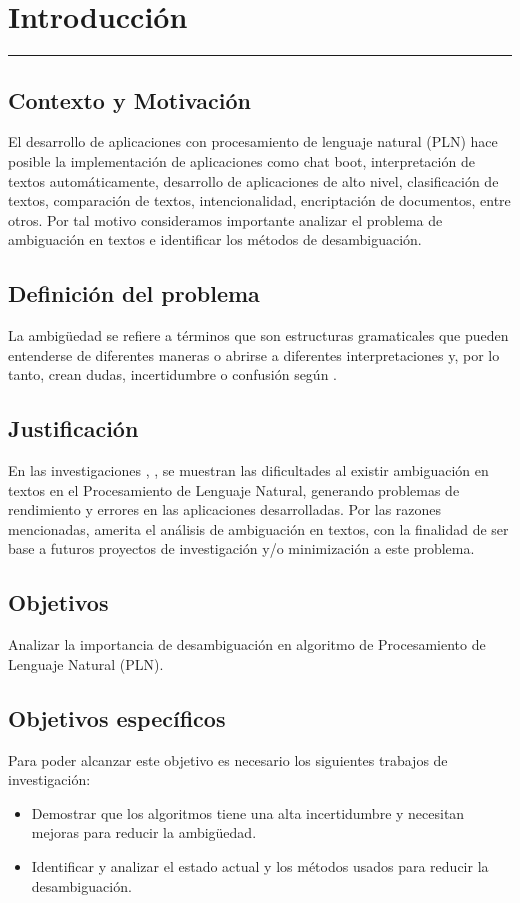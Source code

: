 \chapter{Introducción}
\hrule \bigskip \vspace*{1cm}
\section{Contexto y Motivación}
El desarrollo de aplicaciones con procesamiento de lenguaje natural (PLN) hace posible la implementación de aplicaciones como chat boot, interpretación de textos automáticamente, desarrollo de aplicaciones de alto nivel, clasificación de textos, comparación de textos, intencionalidad, encriptación de documentos, entre otros. Por tal motivo consideramos importante analizar el problema de ambiguación en textos e identificar los métodos de desambiguación. 

\section{Definición del problema}
La ambigüedad se refiere a términos que son estructuras gramaticales que pueden entenderse de diferentes maneras o abrirse a diferentes interpretaciones y, por lo tanto, crean dudas, incertidumbre o confusión según \cite{EvaluacionAmbiguedad01}.

\section{Justificación}
En las investigaciones \cite{ChatBoot}, \cite{055} , \cite{056}se muestran las dificultades al existir ambiguación en textos en el Procesamiento de Lenguaje Natural, generando problemas de rendimiento y errores en las aplicaciones desarrolladas. Por las razones mencionadas, amerita el análisis de ambiguación en textos, con la finalidad de ser base a futuros proyectos de investigación y/o minimización a este problema. 

\section{Objetivos}

 Analizar la importancia de desambiguación en algoritmo de Procesamiento de Lenguaje Natural (PLN).

\section{Objetivos específicos}
Para poder alcanzar este objetivo es necesario los siguientes trabajos de investigación:
\begin{itemize}
  \item Demostrar que los algoritmos tiene una alta incertidumbre y necesitan mejoras para reducir la ambigüedad.
  \item Identificar y analizar el estado actual y los métodos usados para reducir la desambiguación.
\end{itemize}

